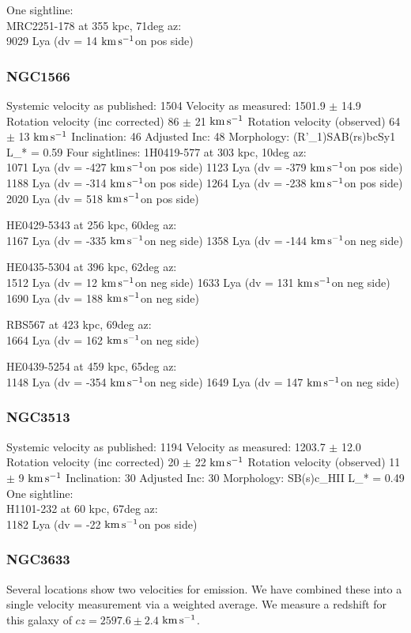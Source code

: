 \documentclass[iop]{emulateapj-rtx4}
\newcommand{\kms}{$\rm km\, s^{-1}$}
\begin{document}
One sightline: \\
MRC2251-178 at 355 kpc, 71deg az: \\
9029 Lya (dv = 14 \kms on pos side)



\subsubsection{NGC1566}
Systemic velocity as published: 1504
Velocity as measured: 1501.9 $\pm$ 14.9
Rotation velocity (inc corrected) 86 $\pm$ 21 \kms
Rotation velocity (observed) 64 $\pm$ 13 \kms
Inclination: 46
Adjusted Inc: 48
Morphology: (R'_1)SAB(rs)bcSy1
L_{\**} = 0.59
Four sightlines: 
1H0419-577 at 303 kpc, 10deg az: \\
1071 Lya (dv = -427 \kms on pos side)
1123 Lya (dv = -379 \kms on pos side)
1188 Lya (dv = -314 \kms on pos side)
1264 Lya (dv = -238 \kms on pos side)
2020 Lya (dv = 518 \kms on pos side)

HE0429-5343 at 256 kpc, 60deg az: \\
1167 Lya (dv = -335 \kms on neg side)
1358 Lya (dv = -144 \kms on neg side)

HE0435-5304 at 396 kpc, 62deg az: \\
1512 Lya (dv = 12 \kms on neg side)
1633 Lya (dv = 131 \kms on neg side)
1690 Lya (dv = 188 \kms on neg side)

RBS567 at 423 kpc, 69deg az: \\
1664 Lya (dv = 162 \kms on neg side)

HE0439-5254 at 459 kpc, 65deg az: \\
1148 Lya (dv = -354 \kms on neg side)
1649 Lya (dv = 147 \kms on neg side)



\subsubsection{NGC3513}
Systemic velocity as published: 1194
Velocity as measured: 1203.7 $\pm$ 12.0
Rotation velocity (inc corrected) 20 $\pm$ 22 \kms
Rotation velocity (observed) 11 $\pm$ 9 \kms
Inclination: 30
Adjusted Inc: 30
Morphology: SB(s)c_HII
L_{\**} = 0.49 \\

One sightline: \\
H1101-232 at 60 kpc, 67deg az: \\
1182 Lya (dv = -22 \kms on pos side)


\subsubsection{NGC3633}
Several locations show two velocities for emission. We have combined these into a single velocity measurement via a weighted average. We measure a redshift for this galaxy of $cz = 2597.6 \pm 2.4$ \kms.
\end{document}
